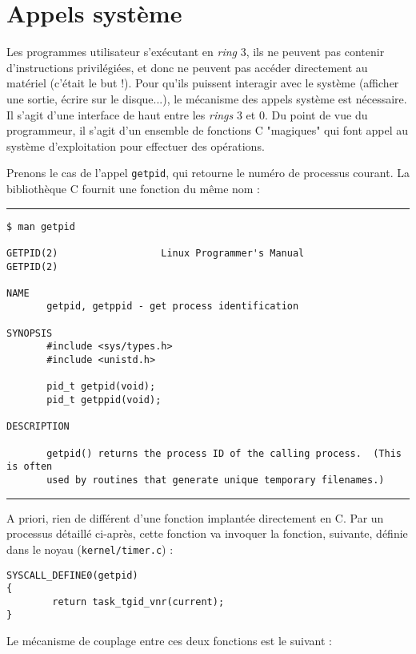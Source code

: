 \section{Appels système}

Les programmes utilisateur s'exécutant en \emph{ring} 3, ils ne peuvent pas
contenir d'instructions privilégiées, et donc ne peuvent pas accéder directement
au matériel (c'était le but !). Pour qu'ils puissent interagir avec le système
(afficher une sortie, écrire sur le disque...), le mécanisme des appels système
est nécessaire. Il s'agit d'une interface de haut entre les \emph{rings} 3 et 0.
Du point de vue du programmeur, il s'agit d'un ensemble de fonctions C
"magiques" qui font appel au système d'exploitation pour effectuer des
opérations.

Prenons le cas de l'appel \texttt{getpid}, qui retourne le numéro de processus
courant. La bibliothèque C fournit une fonction du même nom :

\begin{center}\rule{3in}{0.4pt}\end{center}
\begin{Verbatim}
$ man getpid

GETPID(2)                  Linux Programmer's Manual                 GETPID(2)

NAME
       getpid, getppid - get process identification

SYNOPSIS
       #include <sys/types.h>
       #include <unistd.h>

       pid_t getpid(void);
       pid_t getppid(void);

DESCRIPTION

       getpid() returns the process ID of the calling process.  (This is often
       used by routines that generate unique temporary filenames.)
\end{Verbatim}
\begin{center}\rule{3in}{0.4pt}\end{center}

A priori, rien de différent d'une fonction implantée directement en C. Par un
processus détaillé ci-après, cette fonction va invoquer la fonction, suivante,
définie dans le noyau (\texttt{kernel/timer.c}) :

\begin{Verbatim}
SYSCALL_DEFINE0(getpid)
{
        return task_tgid_vnr(current);
}
\end{Verbatim}

Le mécanisme de couplage entre ces deux fonctions est le suivant :

